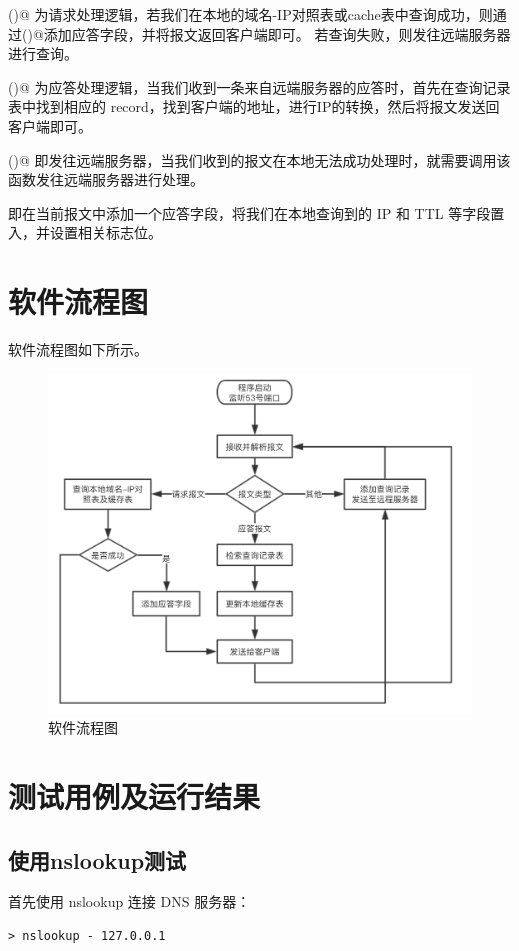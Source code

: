 \documentclass[]{article}
\begin{document}
        \verb@parseRequest()@ 为请求处理逻辑，若我们在本地的域名-IP对照表或cache表中查询成功，则通过\verb@addAnswerSection()@添加应答字段，并将报文返回客户端即可。
        若查询失败，则发往远端服务器进行查询。

        \verb@parseResponse()@ 为应答处理逻辑，当我们收到一条来自远端服务器的应答时，首先在查询记录表中找到相应的 record，找到客户端的地址，进行IP的转换，然后将报文发送回客户端即可。

        \verb@sendToServer()@ 即发往远端服务器，当我们收到的报文在本地无法成功处理时，就需要调用该函数发往远端服务器进行处理。

        \verb@addAnswerSection@ 即在当前报文中添加一个应答字段，将我们在本地查询到的 IP 和 TTL 等字段置入，并设置相关标志位。

\section{软件流程图}
    软件流程图如下所示。
    \begin{figure}[ht]
        \centering
        \includegraphics[scale=0.4]{flowchart.png}
        \caption{软件流程图}
    \end{figure}

\section{测试用例及运行结果}
    \subsection{使用nslookup测试}
        首先使用 nslookup 连接 DNS 服务器：
            \begin{lstlisting}
> nslookup - 127.0.0.1
            \end{lstlisting}
\end{document}
